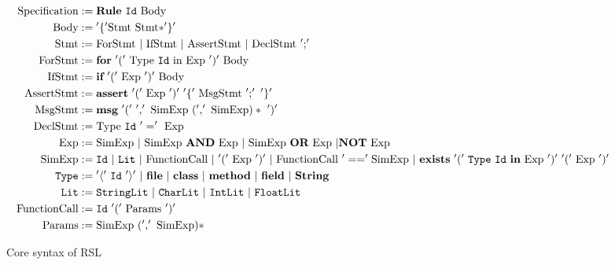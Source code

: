 \begin{figure}[h]
\footnotesize
\vspace{-1em}
\begin{align*}
\textrm{Specification} := &\;\textbf{Rule}\ {\tt Id}\ \textrm{Body} \\
\textrm{Body} := &\;'\{' \textrm{Stmt}\ \textrm{Stmt}* '\}' \\
\textrm{Stmt} := &\;\textrm{ForStmt}\ |\ \textrm{IfStmt}\ |\ \textrm{AssertStmt}\ |\ \textrm{DeclStmt}\ ';' \\
\textrm{ForStmt} := &\;\textbf{for}\ '('\ \textrm{Type}\ {\tt Id}\ \textrm{in}\ \textrm{Exp}\ ')'\ \textrm{Body} \\
\textrm{IfStmt} := &\;\textbf{if}\ '('\ \textrm{Exp}\ ')'\ \textrm{Body}\\
\textrm{AssertStmt} := &\;\textbf{assert}\ '('\ \textrm{Exp}\ ')'\ '\{'\ \textrm{MsgStmt}\ ';'\ '\}' \\
\textrm{MsgStmt} := &\;\textbf{msg}\ '('\ ','\ \textrm{SimExp}\ (','\ \textrm{SimExp})*\ ')'\\
\textrm{DeclStmt} := &\;\textrm{Type}\ {\tt Id}\ '='\ \textrm{Exp}\\
\textrm{Exp} := &\;\textrm{SimExp}\ |\ \textrm{SimExp}\ \textbf{AND}\ \textrm{Exp}\ |\  \textrm{SimExp}\ \textbf{OR}\ \textrm{Exp}\ | \textbf{NOT}\ \textrm{Exp} \\
\textrm{SimExp} := &\;{\tt Id}\ |\ {\tt Lit}\ |\ \textrm{FunctionCall}\ |\ '('\ \textrm{Exp}\ ')'\ |\ \textrm{FunctionCall}\ '==' \textrm{SimExp}\ |\ \textbf{exists}\ '('\ {\tt Type}\ {\tt Id}\ \textbf{in}\ \textrm{Exp}\ ')'\ '('\ \textrm{Exp}\ ')' \\
{\tt Type} := &\;'\langle'\ {\tt Id}\ '\rangle'\ |\ \textbf{file}\ |\ \textbf{class}\ |\ \textbf{method}\ |\ \textbf{field}\ |\ \textbf{String} \\
{\tt Lit} := &\;{\tt StringLit}\ |\ {\tt CharLit}\ |\ {\tt IntLit}\ |\ {\tt FloatLit} \\
\textrm{FunctionCall} := &\;{\tt Id}\ '('\ \textrm{Params}\ ')' \\
\textrm{Params} := &\;\textrm{SimExp}\ (','\ \textrm{SimExp})* \\
\end{align*}
\vspace{-4.5em}
\caption{Core syntax of RSL}\label{fig:syntax}
\vspace{-2.em}
\end{figure}
 
